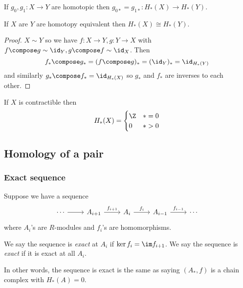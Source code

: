 \documentclass[a4paper]{article}
\begin{document}
\begin{corollary}
  If \(g_0, g_1: X \to Y\) are homotopic then \(g_{0*} = g_{1*}: H_*(X) \to H_*(Y)\).
\end{corollary}

\begin{corollary}
  If \(X\) are \(Y\) are homotopy equivalent then \(H_*(X) \cong H_*(Y)\).
\end{corollary}

\begin{proof}
  \(X \sim Y\) so we have \(f: X \to Y, g: Y \to X\) with \(f \compose g \sim \id_Y, g \compose f \sim \id_X\). Then
  \[
    f_* \compose g_* = (f \compose g)_* = (\id_Y)_* = \id_{H_*(Y)}
  \]
  and similarly \(g_* \compose f_* = \id_{H_*(X)}\) so \(g_*\) and \(f_*\) are inverses to each other.
\end{proof}

\begin{corollary}
  If \(X\) is contractible then
  \[
    H_*(X) =
    \begin{cases}
      \Z & * = 0 \\
      0 & * > 0
    \end{cases}
  \]
\end{corollary}

\subsection{Homology of a pair}

\subsubsection{Exact sequence}

Suppose we have a sequence
\[
  \begin{tikzcd}
    \cdots \ar[r] & A_{i + 1} \ar[r, "f_{i + 1}"] & A_i \ar[r, "f_i"] & A_{i - 1} \ar[r, "f_{i - 1}"] & \cdots
  \end{tikzcd}
\]
where \(A_i\)'s are \(R\)-modules and \(f_i\)'s are homomorphisms.

\begin{definition}
  We say the sequence is \emph{exact} at \(A_i\) if \(\ker f_i = \im f_{i + 1}\). We say the sequence is \emph{exact} if it is exact at all \(A_i\).
\end{definition}

In other words, the sequence is exact is the same as saying \((A_*, f)\) is a chain complex with \(H_*(A) = 0\).
\end{document}
